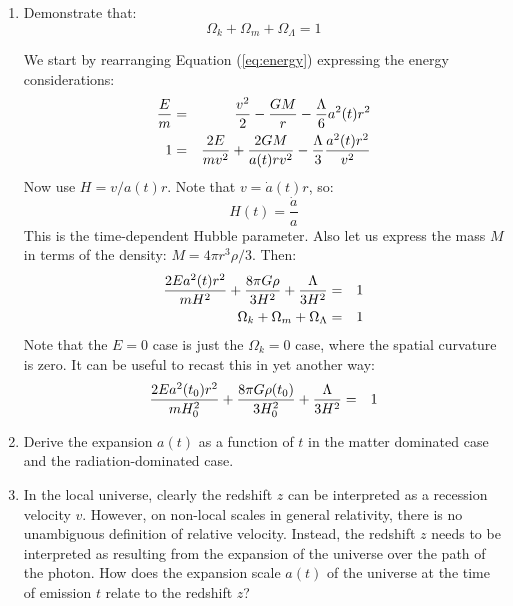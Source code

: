 \begin{enumerate}
\item Demonstrate that:
\begin{equation}
\Omega_k + \Omega_m + \Omega_\Lambda = 1
\end{equation}
\begin{answer}
We start by rearranging Equation (\ref{eq:energy}) expressing the
energy considerations:
\begin{eqnarray}
\frac{E}{m} &=& \frac{v^2}{2}-\frac{GM}{r} - \frac{\Lambda}{6}a^2(t)r^2 \cr
1 &=& \frac{2E}{mv^2} + \frac{2GM}{a(t) rv^2} -
\frac{\Lambda}{3}\frac{a^2(t) r^2}{v^2} 
\end{eqnarray}
Now use $H=v/a(t)r$. Note that $v={\dot a}(t) r$, so:
\begin{equation}
H(t) = \frac{\dot a}{a}
\end{equation}
This is the time-dependent Hubble parameter. Also let us express the
mass $M$ in terms of the density: $M=4\pi r^3\rho/3$. Then:
\begin{eqnarray}
\frac{2Ea^2(t) r^2}{mH^2} + \frac{8\pi
  G\rho}{3H^2}+\frac{\Lambda}{3H^2} &=& 1 \cr 
\Omega_k + \Omega_m + \Omega_\Lambda &=& 1
\end{eqnarray}
Note that the $E=0$ case is just the $\Omega_k=0$ case, where the
spatial curvature is zero. It can be useful to recast this in yet
another way:
\begin{eqnarray}
\frac{2Ea^2(t_0) r^2}{mH_0^2} + \frac{8\pi
  G\rho(t_0)}{3H_0^2}+\frac{\Lambda}{3H^2} &=& 1 \cr 
\end{eqnarray}
\end{answer}
\item Derive the expansion $a(t)$ as a function of $t$ in the matter
dominated case and the radiation-dominated case.
\item 
In the local universe, clearly the redshift $z$ can be interpreted as
a recession velocity $v$.  However, on non-local scales in general
relativity, there is no unambiguous definition of relative
velocity. Instead, the redshift $z$ needs to be interpreted as
resulting from the expansion of the universe over the path of the
photon.  How does the expansion scale $a(t)$ of the universe at the
time of emission $t$ relate to the redshift $z$?


\end{enumerate}
